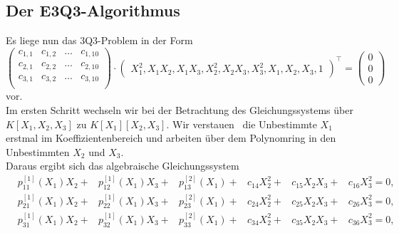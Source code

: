 \documentclass[a4paper,oneside, 11pt, openany%
]{article}
\theoremstyle{custom}
\theoremstyle{custom}
\begin{document}
	\subsection[Der E3Q3-Algorithmus]{Der E3Q3-Algorithmus~\cite{kukelova2016efficient}}\label{sec:E3Q3}
	Es liege nun das 3Q3-Problem in der Form
	\begin{equation*}
		\begin{pmatrix}
			c_{1,1}&c_{1,2}&\ldots&c_{1,10}\\
			c_{2,1}&c_{2,2}&\ldots&c_{2,10}\\
			c_{3,1}&c_{3,2}&\ldots&c_{3,10}\\
		\end{pmatrix} \cdot
		\begin{pmatrix}
			X_{1}^{2},X_{1}X_{2},X_{1}X_{3},X_{2}^{2},X_{2}X_{3},X_{3}^{2},X_{1},X_{2},X_{3},1
		\end{pmatrix}^\top =  \begin{pmatrix}
		 0\\0\\0
		\end{pmatrix}
	\end{equation*}
	vor.\\
	Im ersten Schritt wechseln wir bei der Betrachtung des Gleichungssystems über $K\left[X_{1},X_{2},X_{3}\right]$ zu $K\left[X_{1}\right] \left[ X_{2},X_{3}\right]$. Wir \glqq verstauen\grqq~ die Unbestimmte $X_{1}$ erstmal im Koeffizientenbereich und arbeiten über dem Polynomring in den Unbestimmten $X_{2}$ und $X_{3}$.\\
	Daraus ergibt sich das algebraische Gleichungssystem 
	\begin{equation}\label{eqn:E3Q3}
\begin{alignedat}{6}
			&p_{11}^{\left[1\right] }\left(X_{1}\right)X_{2}+
			&p_{12}^{\left[1\right] }\left(X_{1}\right)X_{3}+
			&p_{13}^{\left[2\right] }\left(X_{1}\right)+
			&c_{14}X_{2}^2+&c_{15}X_{2}X_{3}+&c_{16}X_{3}^2=0,\\
			&p_{21}^{\left[1\right] }\left(X_{1}\right)X_{2}+
			&p_{22}^{\left[1\right] }\left(X_{1}\right)X_{3}+
			&p_{23}^{\left[2\right] }\left(X_{1}\right)+
			&c_{24}X_{2}^2+&c_{25}X_{2}X_{3}+&c_{26}X_{3}^2=0,\\
			&p_{31}^{\left[1\right] }\left(X_{1}\right)X_{2}+
			&p_{32}^{\left[1\right] }\left(X_{1}\right)X_{3}+
			&p_{33}^{\left[2\right] }\left(X_{1}\right)+
			&c_{34}X_{2}^2+&c_{35}X_{2}X_{3}+&c_{36}X_{3}^2=0,
\end{alignedat}
	\end{equation}
\end{document}
